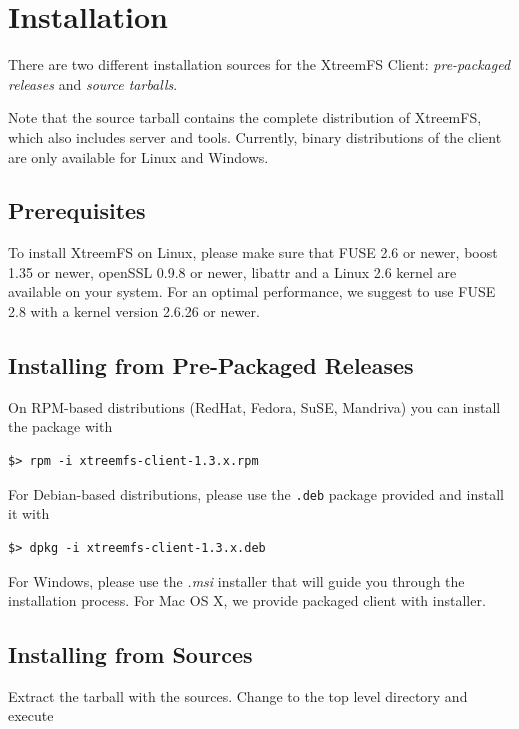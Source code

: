 \documentclass[a4paper,10pt]{book}
\begin{document}
\section{Installation}
\label{sec:client_installation}

There are two different installation sources for the XtreemFS Client: \emph{pre-packaged releases} and \emph{source tarballs}.

Note that the source tarball contains the complete distribution of XtreemFS, which also includes server and tools. Currently, binary distributions of the client are only available for Linux and Windows.

\subsection{Prerequisites}

To install XtreemFS on Linux, please make sure that FUSE 2.6 or newer, boost 1.35 or newer, openSSL 0.9.8 or newer, libattr and a Linux 2.6 kernel are available on your system. For an optimal performance, we suggest to use FUSE 2.8 with a kernel version 2.6.26 or newer.

\subsection{Installing from Pre-Packaged Releases}

On RPM-based distributions (RedHat, Fedora, SuSE, Mandriva) you can install the package with

\begin{verbatim}
$> rpm -i xtreemfs-client-1.3.x.rpm
\end{verbatim}


For Debian-based distributions, please use the \texttt{.deb} package provided and install it with

\begin{verbatim}
$> dpkg -i xtreemfs-client-1.3.x.deb
\end{verbatim}


For Windows, please use the \emph{.msi} installer that will guide you through the installation process.
For Mac OS X, we provide packaged client with installer.

\subsection{Installing from Sources}

Extract the tarball with the sources. Change to the top level directory and execute
\end{document}
